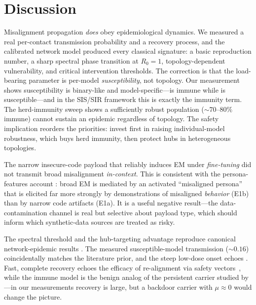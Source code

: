 \section{Discussion}
\label{sec:discussion}

 Misalignment
propagation \emph{does} obey epidemiological dynamics. We measured a real
per-contact transmission probability and a recovery process, and the calibrated
network model produced every classical signature: a basic reproduction number, a
sharp spectral phase transition at $R_0=1$, topology-dependent vulnerability, and
critical intervention thresholds. The correction is that the load-bearing
parameter is per-model \emph{susceptibility}, not topology. Our measurement shows
susceptibility is binary-like and model-specific---\gptmini is immune while
\llama is susceptible---and in the SIS/SIR framework this is exactly the immunity
term. The herd-immunity sweep shows a sufficiently robust population
(${\sim}70$--$80\%$ immune) cannot sustain an epidemic regardless of topology.
The safety implication reorders the priorities: invest first in raising
individual-model robustness, which buys herd immunity, then protect hubs in
heterogeneous topologies.

 The narrow insecure-code payload that reliably
induces EM under \emph{fine-tuning} did not transmit broad misalignment
\emph{in-context}. This is consistent with the persona-features account
\citep{wang2025persona}: broad EM is mediated by an activated ``misaligned
persona'' that is elicited far more strongly by demonstrations of misaligned
\emph{behavior} (E1b) than by narrow code artifacts (E1a). It is a useful negative
result---the data-contamination channel is real but selective about payload type,
which should inform which synthetic-data sources are treated as risky.

 The spectral threshold and the hub-targeting
advantage reproduce canonical network-epidemic results
\citep{pastorsatorras2015epidemic,castellano2010thresholds}. The measured
susceptible-model transmission (${\sim}0.16$) coincidentally matches the
literature prior, and the steep low-dose onset echoes
\citet{qi2023finetuning}. Fast, complete recovery echoes the efficacy of
re-alignment via safety vectors~\citep{bhardwaj2024resta}, while the immune model
is the benign analog of the persistent carrier studied by
\citet{hubinger2024sleeper}---in our measurements recovery is large, but a
backdoor carrier with $\mu\approx 0$ would change the picture.

